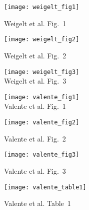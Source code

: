 \documentclass[t]{beamer}
\begin{document}
\begin{frame}
		\texttt{[image: weigelt\_fig1]}
		
		\tinyfill Weigelt et al. Fig.~1
\end{frame}

\begin{frame}
	\texttt{[image: weigelt\_fig2]}

		\tinyfill Weigelt et al. Fig.~2
\end{frame}

\begin{frame}
	\centering
	\texttt{[image: weigelt\_fig3]}\\
	
			\tinyfill Weigelt et al. Fig.~3
\end{frame}

\begin{frame}
	\centering
	\texttt{[image: valente\_fig1]}\\
	
	\tinyfill Valente et al. Fig.~1
\end{frame}

\begin{frame}
	\texttt{[image: valente\_fig2]}
	
	\tinyfill Valente et al. Fig.~2
\end{frame}

\begin{frame}
	\texttt{[image: valente\_fig3]}

	\tinyfill Valente et al. Fig.~3
\end{frame}

\begin{frame}
	\texttt{[image: valente\_table1]}
	
	\tinyfill Valente et al. Table~1

\end{frame}
\end{document}
